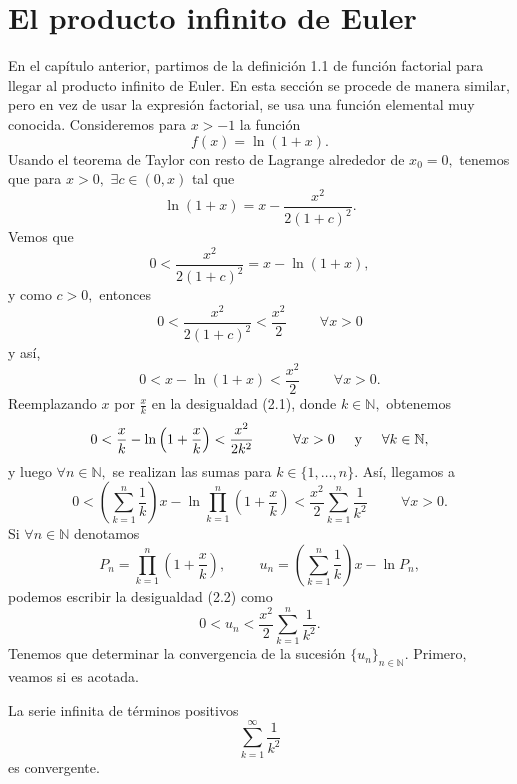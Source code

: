 \section{El producto infinito de Euler}
En el capítulo anterior, partimos de la definición 1.1 de función factorial para llegar al producto infinito de Euler. En esta sección se procede de manera similar, pero en vez de usar la expresión factorial, se usa una función elemental muy conocida. Consideremos para $x > -1$ la función $$f(x) = \ln (1+x).$$ Usando el teorema de Taylor con resto de Lagrange alrededor de $x_0 = 0,$ tenemos que para $x > 0,$ $\exists c \in (0,x)$ tal que $$\ln (1+x) = x-\frac{x^2}{2(1+c)^2}.$$ Vemos que $$0 < \frac{x^2}{2(1+c)^2} = x-\ln (1+x),$$ y como $c > 0,$ entonces $$0 < \frac{x^2}{2(1+c)^2} < \frac{x^2}{2}\hspace{1cm}\forall x > 0$$ y así,
\begin{equation}
0 < x-\ln (1+x) < \frac{x^2}{2}\hspace{1cm}\forall x > 0.
\end{equation}
Reemplazando $x$ por $\tfrac{x}{k}$ en la desigualdad (2.1), donde $k \in \mathbb{N},$ obtenemos $$0 < \frac{x}{k}-\ln \left(1+\frac{x}{k}\right) < \frac{x^2}{2k^2}\hspace{1cm}\forall x > 0\hspace{0.5cm}\textrm{y}\hspace{0.5cm} \forall k \in \mathbb{N},$$ y luego $\forall n \in \mathbb{N},$ se realizan las sumas para $k \in \{1,\dots,n\}.$ Así, llegamos a
\begin{equation}
0 < \left(\sum_{k = 1}^{n}\frac{1}{k}\right)x-\ln \prod_{k = 1}^{n} \left(1+\frac{x}{k}\right) < \frac{x^2}{2}\sum_{k = 1}^{n} \frac{1}{k^2}\hspace{1cm}\forall x > 0.
\end{equation}
Si $\forall n \in \mathbb{N}$ denotamos $$P_n = \prod_{k = 1}^{n}\left(1+\frac{x}{k}\right), \hspace{1cm} u_n = \left(\sum_{k = 1}^{n}\frac{1}{k}\right)x-\ln P_n,$$ podemos escribir la desigualdad (2.2) como
\begin{equation}
0 < u_n < \frac{x^2}{2}\sum_{k = 1}^{n}\frac{1}{k^2}.
\end{equation}
Tenemos que determinar la convergencia de la sucesión $\{u_n\}_{n \in \mathbb{N}}.$ Primero, veamos si es acotada.
\begin{proposition}
	La serie infinita de términos positivos $$\sum_{k = 1}^{\infty}\frac{1}{k^2}$$ es convergente.
\end{proposition}
